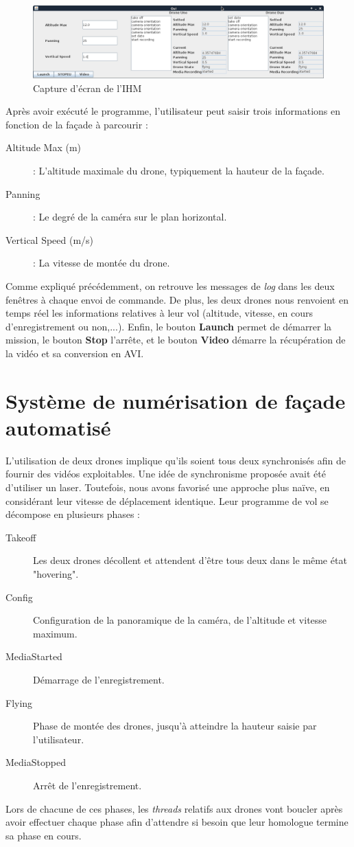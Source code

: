 \documentclass[12pt, openany]{report}
\begin{document}
\begin{figure}[!h]
  \centering
  \includegraphics[width=\textwidth]{figures/ihm.png}
  \caption{Capture d'écran de l'IHM}
  \label{fig:schema}
\end{figure}
  
Après avoir exécuté le programme, l'utilisateur peut saisir trois informations en fonction de la façade à parcourir :
\begin{description}
\item[Altitude Max (m)] : L'altitude maximale du drone, typiquement la hauteur de la façade.
\item[Panning] : Le degré de la caméra sur le plan horizontal.
\item[Vertical Speed (m/s)] : La vitesse de montée du drone.
\end{description}
Comme expliqué précédemment, on retrouve les messages de \textit{log} dans les deux fenêtres à chaque envoi de commande. De plus, les deux drones nous renvoient en temps réel les informations relatives à leur vol (altitude, vitesse, en cours d'enregistrement ou non,...).
Enfin, le bouton \textbf{Launch} permet de démarrer la mission, le bouton \textbf{Stop} l'arrête, et le bouton \textbf{Video} démarre la récupération de la vidéo et sa conversion en AVI.


\section{Système de numérisation de façade automatisé}
L'utilisation de deux drones implique qu'ils soient tous deux synchronisés afin de fournir des vidéos exploitables. Une idée de synchronisme proposée avait été d'utiliser un laser. Toutefois, nous avons favorisé une approche plus naïve, en considérant leur vitesse de déplacement identique. Leur programme de vol se décompose en plusieurs phases :
\begin{description}
\item[Takeoff] Les deux drones décollent et attendent d'être tous deux dans le même état "hovering".
\item[Config] Configuration de la panoramique de la caméra, de l'altitude et vitesse maximum.
\item[MediaStarted] Démarrage de l'enregistrement.
\item[Flying] Phase de montée des drones, jusqu'à atteindre la hauteur saisie par l'utilisateur.
\item[MediaStopped] Arrêt de l'enregistrement.
\end{description}
Lors de chacune de ces phases, les \textit{threads} relatifs aux drones vont boucler après avoir effectuer chaque phase afin d'attendre si besoin que leur homologue termine sa phase en cours.
\end{document}
